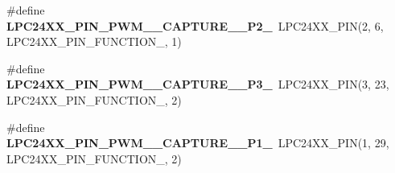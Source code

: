 \begin{DoxyCompactItemize}
\item 
\mbox{\label{group__lpc24xx__io_ga605e4da60dc4a4d5a5683034c8284df5}} 
\#define {\bfseries L\+P\+C24\+X\+X\+\_\+\+P\+I\+N\+\_\+\+P\+W\+M\+\_\+\_\+\+C\+A\+P\+T\+U\+R\+E\+\_\+\_\+\+P2\+\_}~L\+P\+C24\+X\+X\+\_\+\+P\+IN(2, 6, L\+P\+C24\+X\+X\+\_\+\+P\+I\+N\+\_\+\+F\+U\+N\+C\+T\+I\+O\+N\+\_, 1)
\item 
\mbox{\label{group__lpc24xx__io_ga4ffe29e3474856cd7dd730df26b9f242}} 
\#define {\bfseries L\+P\+C24\+X\+X\+\_\+\+P\+I\+N\+\_\+\+P\+W\+M\+\_\+\_\+\+C\+A\+P\+T\+U\+R\+E\+\_\+\_\+\+P3\+\_}~L\+P\+C24\+X\+X\+\_\+\+P\+IN(3, 23, L\+P\+C24\+X\+X\+\_\+\+P\+I\+N\+\_\+\+F\+U\+N\+C\+T\+I\+O\+N\+\_, 2)
\item 
\mbox{\label{group__lpc24xx__io_ga7758c5f21d6116341f683eefb1d2bff8}} 
\#define {\bfseries L\+P\+C24\+X\+X\+\_\+\+P\+I\+N\+\_\+\+P\+W\+M\+\_\+\_\+\+C\+A\+P\+T\+U\+R\+E\+\_\+\_\+\+P1\+\_}~L\+P\+C24\+X\+X\+\_\+\+P\+IN(1, 29, L\+P\+C24\+X\+X\+\_\+\+P\+I\+N\+\_\+\+F\+U\+N\+C\+T\+I\+O\+N\+\_, 2)
\end{DoxyCompactItemize}
